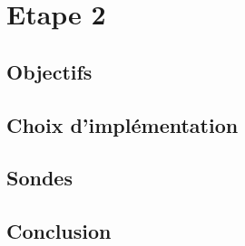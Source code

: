 \section{Etape 2}
\subsection{Objectifs}
\subsection{Choix d'implémentation}
\subsection{Sondes}
\subsection{Conclusion}
